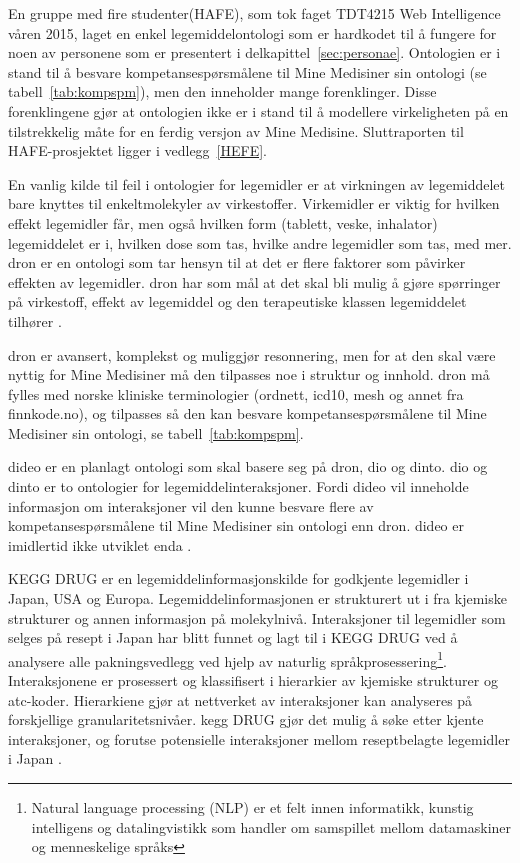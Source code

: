 En gruppe med fire studenter(HAFE), som tok faget TDT4215 Web Intelligence våren 2015, laget en enkel legemiddelontologi som er hardkodet til å fungere for noen av personene som er presentert i delkapittel~\ref{sec:personae}. Ontologien er i stand til å besvare kompetansespørsmålene til Mine Medisiner sin ontologi (se tabell~\ref{tab:kompspm}), men den inneholder mange forenklinger. Disse forenklingene gjør at ontologien ikke er i stand til å modellere virkeligheten på en tilstrekkelig måte for en ferdig versjon av Mine Medisine. Sluttraporten til HAFE-prosjektet ligger i vedlegg~\ref{HEFE}.

En vanlig kilde til feil i ontologier for legemidler er at virkningen av legemiddelet bare knyttes til enkeltmolekyler av virkestoffer. Virkemidler er viktig for hvilken effekt legemidler får, men også hvilken form (tablett, veske, inhalator) legemiddelet er i, hvilken dose som tas, hvilke andre legemidler som tas, med mer. \acrfull{dron} er en ontologi som tar hensyn til at det er flere faktorer som påvirker effekten av legemidler. \acrshort{dron} har som mål at det skal bli mulig å gjøre spørringer på virkestoff, effekt av legemiddel og den terapeutiske klassen legemiddelet tilhører \citep{HoganTowards, BuildingDrugOntology}.

\acrshort{dron} er avansert, komplekst og muliggjør resonnering, men for at den skal være nyttig for Mine Medisiner må den tilpasses noe i struktur og innhold. \acrshort{dron} må fylles med norske kliniske terminologier (ordnett, \acrshort{icd}10, \acrshort{mesh} og annet fra finnkode.no), og tilpasses så den kan besvare kompetansespørsmålene til Mine Medisiner sin ontologi, se tabell~\ref{tab:kompspm}. 

\acrfull{dideo} er en planlagt ontologi som skal basere seg på \acrshort{dron}, \acrfull{dio} og \acrfull{dinto}. \acrshort{dio} og \acrshort{dinto} er to ontologier for legemiddelinteraksjoner. Fordi \acrshort{dideo} vil inneholde informasjon om interaksjoner vil den kunne besvare flere av kompetansespørsmålene til Mine Medisiner sin ontologi enn \acrshort{dron}. \acrshort{dideo} er imidlertid ikke utviklet enda \citep{brochhausen2014towards}.

KEGG DRUG er en legemiddelinformasjonskilde for godkjente legemidler i Japan, USA og Europa. Legemiddelinformasjonen er strukturert ut i fra kjemiske strukturer og annen informasjon på molekylnivå. Interaksjoner til legemidler som selges på resept i Japan har blitt funnet og lagt til i KEGG DRUG ved å analysere alle pakningsvedlegg ved hjelp av naturlig språkprosessering\footnote{Natural language processing (NLP) er et felt innen informatikk, kunstig intelligens og datalingvistikk som handler om samspillet mellom datamaskiner og menneskelige språks}. Interaksjonene er prosessert og klassifisert i hierarkier av kjemiske strukturer og \acrshort{atc}-koder. Hierarkiene gjør at nettverket av interaksjoner kan analyseres på forskjellige granularitetsnivåer. \acrshort{kegg} DRUG gjør det mulig å søke etter kjente interaksjoner, og forutse potensielle interaksjoner mellom reseptbelagte legemidler i Japan \citep{takarabe2011network}.


